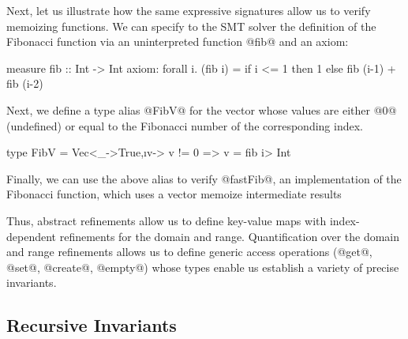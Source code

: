 {{{{ 
Next, let us illustrate how the same expressive signatures allow us to
verify memoizing functions. We can specify to the SMT solver the 
definition of the Fibonacci function via an uninterpreted function 
@fib@ and an axiom:
%
\begin{code}
  measure fib :: Int -> Int
  axiom: forall i. (fib i) = if i <= 1 then 1 else fib (i-1) + fib (i-2)
\end{code}
%
Next, we define a type alias @FibV@ for the vector 
whose values are either @0@ (\ie undefined) or 
equal to the Fibonacci number of the corresponding index. 
%
\begin{code}
  type FibV = Vec<{\_->True},{\i v-> v != 0 => v = fib i}> Int 
\end{code}
%
Finally, we can use the above alias to verify @fastFib@, 
an implementation of the Fibonacci function, which uses 
a vector memoize intermediate results 
%
%
%
Thus, abstract refinements allow us to define key-value maps with
index-dependent refinements for the domain and range. 
Quantification over the domain and range refinements allows us
to define generic access operations (\eg @get@, @set@,
@create@, @empty@) whose types enable us establish
a variety of precise invariants.

\subsection{Recursive Invariants}\label{sec:overview:rec}

}}}}
